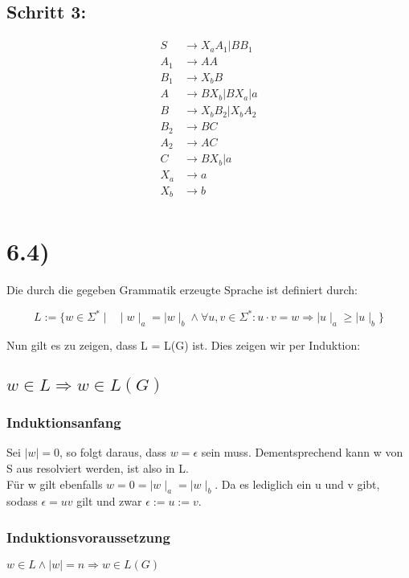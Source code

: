 \documentclass[12pt, a4paper]{article}
\begin{document}
\subsection*{Schritt 3:}
\begin{align*}
S &\rightarrow X_aA_1|BB_1 \\
A_1 &\rightarrow AA \\
B_1 &\rightarrow X_bB \\
A &\rightarrow BX_b | BX_a | a \\
B &\rightarrow X_bB_2|X_bA_2 \\
B_2 &\rightarrow BC \\
A_2 &\rightarrow AC \\
C &\rightarrow BX_b|a \\
X_a &\rightarrow a \\
X_b &\rightarrow b \\
\end{align*}

\section*{6.4)}

Die durch die gegeben Grammatik erzeugte Sprache ist definiert durch:

\begin{equation}
L := \{ w \in \Sigma^* \mid \text{   } \mid w \mid_{a} = \mid w \mid_{b} \wedge \forall u,v \in \Sigma^*: u \cdot v = w \Rightarrow \mid u \mid_{a} \ge \mid u \mid_{b} \}
\end{equation}

Nun gilt es zu zeigen, dass L = L(G) ist. Dies zeigen wir per Induktion:

\subsection*{$w \in L \Rightarrow w \in L(G)$}
\subsubsection*{Induktionsanfang}
Sei $\mid w \mid = 0$, so folgt daraus, dass $w = \epsilon$ sein muss. Dementsprechend kann w von S aus resolviert werden, ist also in L.\\
Für w gilt ebenfalls $w = 0 = \mid w \mid_a = \mid w \mid_b $. Da es lediglich ein u und v gibt, sodass $ \epsilon = uv$ gilt und zwar $\epsilon := u := v$.

\subsubsection*{Induktionsvoraussetzung}
$ w \in L \wedge \mid w \mid = n  \Rightarrow w \in L(G)$
\end{document}
